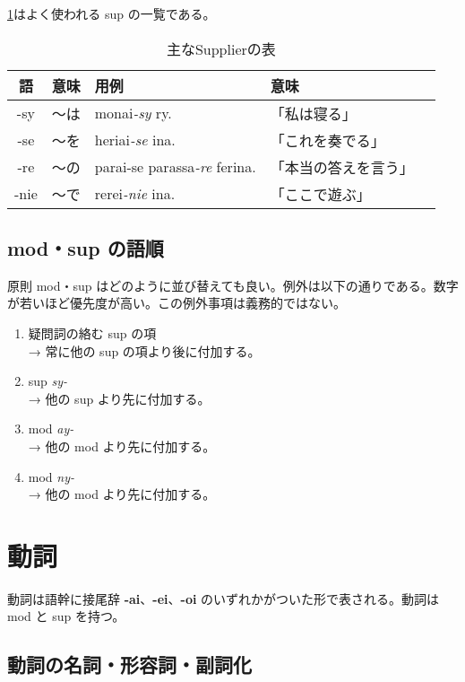 \cref{table:common-sups}はよく使われる sup の一覧である。

\begin{table}[H]
    \centering
    \caption{主なSupplierの表}
    \label{table:common-sups}
    \begin{tabular}{cclll}
        \toprule
        語 & 意味 & 用例 & 意味 \\
        \midrule
        -sy  & ～は & monai\emph{-sy} ry.                & 「私は寝る」\\
        -se  & ～を & heriai\emph{-se} ina.              & 「これを奏でる」\\
        -re  & ～の & parai-se parassa\emph{-re} ferina. & 「本当の答えを言う」\\
        -nie & ～で & rerei\emph{-nie} ina.              & 「ここで遊ぶ」 \\
        \bottomrule
    \end{tabular}
\end{table}

\subsection{mod・sup の語順}

原則 mod・sup はどのように並び替えても良い。例外は以下の通りである。数字が若いほど優先度が高い。この例外事項は義務的ではない。

\begin{enumerate}
    \item 疑問詞の絡む sup の項 \\ → 常に他の sup の項より後に付加する。
    \item sup \emph{sy-} \\ → 他の sup より先に付加する。
    \item mod \emph{ay-} \\ → 他の mod より先に付加する。
    \item mod \emph{ny-} \\ → 他の mod より先に付加する。
\end{enumerate}

\section{動詞}

動詞は語幹に接尾辞 \textbf{-ai}、\textbf{-ei}、\textbf{-oi} のいずれかがついた形で表される。動詞は mod と sup を持つ。

\subsection{動詞の名詞・形容詞・副詞化}

